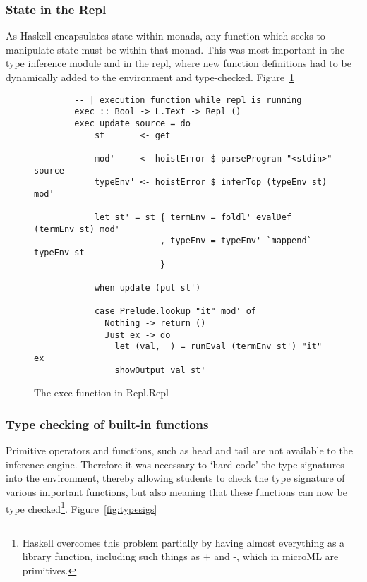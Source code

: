 \subsubsection{State in the Repl}
As Haskell encapsulates state within monads, any function which seeks to manipulate state must be
within that monad. This was most important in the type inference module and in the repl, where new
function definitions had to be dynamically added to the environment and type-checked.
Figure~\ref{fig:exec}

\begin{landscape}
\begin{figure}
    \begin{verbatim}
        -- | execution function while repl is running
        exec :: Bool -> L.Text -> Repl ()
        exec update source = do
            st       <- get

            mod'     <- hoistError $ parseProgram "<stdin>" source
            typeEnv' <- hoistError $ inferTop (typeEnv st) mod'

            let st' = st { termEnv = foldl' evalDef (termEnv st) mod'
                         , typeEnv = typeEnv' `mappend` typeEnv st 
                         }

            when update (put st')

            case Prelude.lookup "it" mod' of
              Nothing -> return ()
              Just ex -> do
                let (val, _) = runEval (termEnv st') "it" ex
                showOutput val st'
    \end{verbatim}
    \caption{The exec function in Repl.Repl}
\label{fig:exec}
\end{figure}
\end{landscape}

\subsubsection{Type checking of built-in functions}
Primitive operators and functions, such as head and tail are not available to the inference engine.
Therefore it was necessary to `hard code' the type signatures into the environment, thereby allowing
students to check the type signature of various important functions, but also meaning that these
functions can now be type checked\footnote{Haskell overcomes this problem partially by having almost
everything as a library function, including such things as + and -, which in microML are
primitives.}. Figure~\ref{fig:typesigs}

